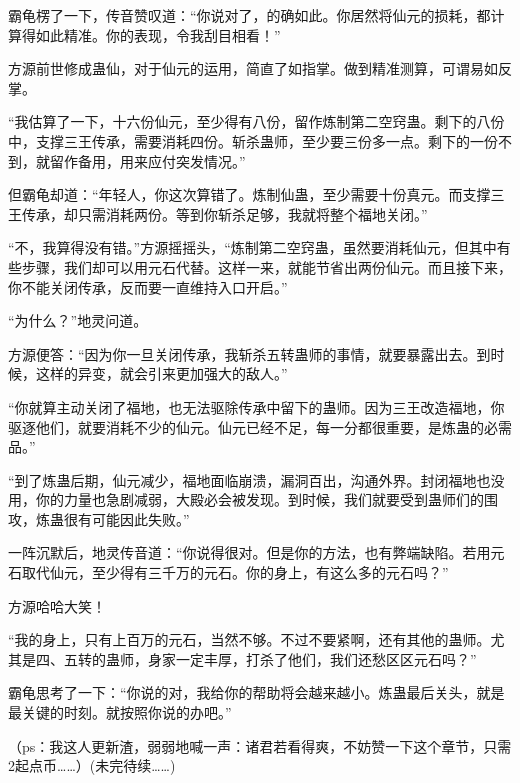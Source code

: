 \begin{this_body}
霸龟楞了一下，传音赞叹道：“你说对了，的确如此。你居然将仙元的损耗，都计算得如此精准。你的表现，令我刮目相看！”

方源前世修成蛊仙，对于仙元的运用，简直了如指掌。做到精准测算，可谓易如反掌。

“我估算了一下，十六份仙元，至少得有八份，留作炼制第二空窍蛊。剩下的八份中，支撑三王传承，需要消耗四份。斩杀蛊师，至少要三份多一点。剩下的一份不到，就留作备用，用来应付突发情况。”

但霸龟却道：“年轻人，你这次算错了。炼制仙蛊，至少需要十份真元。而支撑三王传承，却只需消耗两份。等到你斩杀足够，我就将整个福地关闭。”

“不，我算得没有错。”方源摇摇头，“炼制第二空窍蛊，虽然要消耗仙元，但其中有些步骤，我们却可以用元石代替。这样一来，就能节省出两份仙元。而且接下来，你不能关闭传承，反而要一直维持入口开启。”

“为什么？”地灵问道。

方源便答：“因为你一旦关闭传承，我斩杀五转蛊师的事情，就要暴露出去。到时候，这样的异变，就会引来更加强大的敌人。”

“你就算主动关闭了福地，也无法驱除传承中留下的蛊师。因为三王改造福地，你驱逐他们，就要消耗不少的仙元。仙元已经不足，每一分都很重要，是炼蛊的必需品。”

“到了炼蛊后期，仙元减少，福地面临崩溃，漏洞百出，沟通外界。封闭福地也没用，你的力量也急剧减弱，大殿必会被发现。到时候，我们就要受到蛊师们的围攻，炼蛊很有可能因此失败。”

一阵沉默后，地灵传音道：“你说得很对。但是你的方法，也有弊端缺陷。若用元石取代仙元，至少得有三千万的元石。你的身上，有这么多的元石吗？”

方源哈哈大笑！

“我的身上，只有上百万的元石，当然不够。不过不要紧啊，还有其他的蛊师。尤其是四、五转的蛊师，身家一定丰厚，打杀了他们，我们还愁区区元石吗？”

霸龟思考了一下：“你说的对，我给你的帮助将会越来越小。炼蛊最后关头，就是最关键的时刻。就按照你说的办吧。”

（ps：我这人更新渣，弱弱地喊一声：诸君若看得爽，不妨赞一下这个章节，只需2起点币……）(未完待续……)

\end{this_body}

